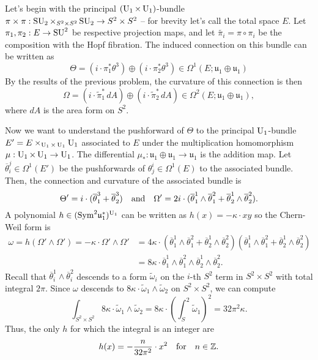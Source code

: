 \documentclass{../../templates/lkx_pset}
\begin{document}
\begin{parts}
	Let's begin with the principal $(\operatorname{U}_1\times \operatorname{U}_1)$-bundle $\pi \times \pi : \operatorname{SU}_2\times_{S^2\times S^2} \operatorname{SU}_2 \to S^2\times S^2$ -- for brevity let's call the total space $E$. Let $\pi_1,\pi_2 : E \to \operatorname{SU}^2$ be respective projection maps, and let $\widetilde{\pi_i}=\pi\circ \pi_i$ be the composition with the Hopf fibration. The induced connection on this bundle can be written as
	\[
		\Theta = (i\cdot \pi_1^*\theta^3) \oplus (i\cdot \pi_2^*\theta^3) \in \Omega^1(E; \mathfrak{u}_1\oplus \mathfrak{u}_1)
	\]
	By the results of the previous problem, the curvature of this connection is then
	\[
		\Omega = (i\cdot \widetilde{\pi}_1^*\, dA) \oplus (i \cdot \widetilde{\pi}_2^*\, dA) \in \Omega^2(E; \mathfrak{u}_1\oplus\mathfrak{u}_1),
	\]
	where $dA$ is the area form on $S^2$.


	Now we want to understand the pushforward of $\Theta$ to the principal $\operatorname{U}_1$-bundle $E'=E\times_{\operatorname{U}_1\times \operatorname{U}_1} \operatorname{U}_1$ associated to $E$ under the multiplication homomorphism $\mu : \operatorname{U}_1\times \operatorname{U}_1\to \operatorname{U}_1$. The differential $\mu_* : \mathfrak{u}_1\oplus \mathfrak{u}_1 \to \mathfrak{u}_1$ is the addition map. Let $\overline{\theta}_i^j\in \Omega^1(E')$ be the pushforwards of $\theta^i_j\in \Omega^1(E)$ to the associated bundle. Then, the connection and curvature of the associated bundle is
	\[
		\Theta' = i\cdot (\overline{\theta}_1^3 + \overline{\theta}_2^3)\quad\textrm{and}\quad\Omega' = 2i\cdot (
		\overline{\theta}^1_1\wedge \overline{\theta}^2_1+
		\overline{\theta}^1_2\wedge \overline{\theta}^2_2
		).
	\]
	A polynomial $h\in (\textrm{Sym}^2\mathfrak{u}_1^*)^{\operatorname{U}_1}$ can be written as $h(x) = -\kappa \cdot xy$ so the Chern-Weil form is
	\[
		\begin{aligned}
			\omega = h(\Omega'\wedge \Omega') = -\kappa \cdot \Omega'\wedge \Omega'
			 & = 4\kappa\cdot
			(\overline{\theta}^1_1\wedge \overline{\theta}^2_1+ \overline{\theta}^1_2\wedge \overline{\theta}^2_2)
			(\overline{\theta}^1_1\wedge \overline{\theta}^2_1+ \overline{\theta}^1_2\wedge \overline{\theta}^2_2) \\
			 & = 8\kappa\cdot
			\overline{\theta}^1_1\wedge \overline{\theta}^2_1\wedge
			\overline{\theta}^1_2\wedge \overline{\theta}^2_2.
		\end{aligned}
	\]
	Recall that $\overline{\theta}^1_i\wedge \overline{\theta}^2_i$ descends to a form $\widetilde{\omega}_i$ on the $i$-th $S^2$ term in $S^2\times S^2$ with total integral $2\pi$. Since $\omega$ descends to $8\kappa\cdot \widetilde{\omega}_1 \wedge \widetilde{\omega}_2$ on $S^2\times S^2$, we can compute
	\[
		\int_{S^2\times S^2} 8\kappa\cdot \widetilde{\omega}_1\wedge \widetilde{\omega}_2 = 8\kappa\cdot\left(\int_S^2 \widetilde{\omega}_1\right)^2 = 32\pi^2\kappa.
	\]
	Thus, the only $h$ for which the integral is an integer are
	\[
		h(x) = -\frac{n}{32\pi^2}\cdot x^2\quad\textrm{for}\quad n\in \mathbb{Z}.
	\]


\end{parts}
\end{document}

